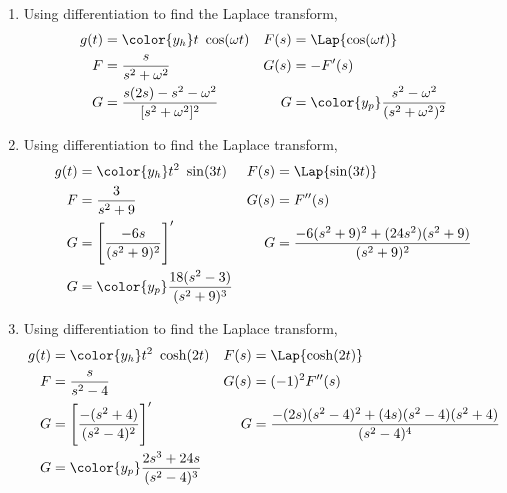 \begin{enumerate}
    \item Using differentiation to find the Laplace transform,
          \begin{align}
              g(t) & = \color{y_h} t\ \cos(\omega t)                         &
              F(s) & = \Lap\{ \cos(\omega t) \}                                \\
              F    & = \frac{s}{s^2 + \omega^2}                              &
              G(s) & = -F'(s)                                                  \\
              G    & = \frac{s(2s) - s^2 - \omega^2}{[s^2 + \omega^2]^2}     &
              G    & = \color{y_p} \frac{s^2 - \omega^2}{(s^2 + \omega^2)^2}
          \end{align}

    \item Using differentiation to find the Laplace transform,
          \begin{align}
              g(t) & = \color{y_h} t^2\ \sin(3t)                            &
              F(s) & = \Lap\{ \sin(3t) \}                                     \\
              F    & = \frac{3}{s^2 + 9}                                    &
              G(s) & = F''(s)                                                 \\
              G    & = \Bigg[ \frac{-6s}{(s^2 + 9)^2} \Bigg]'               &
              G    & = \frac{-6(s^2 + 9)^2 + (24s^2)(s^2 + 9)}{(s^2 + 9)^2}   \\
              G    & = \color{y_p} \frac{18(s^2 - 3)}{(s^2 + 9)^3}
          \end{align}

    \item Using differentiation to find the Laplace transform,
          \begin{align}
              g(t) & = \color{y_h} t^2\ \cosh(2t)                                    &
              F(s) & = \Lap\{ \cosh(2t) \}                                             \\
              F    & = \frac{s}{s^2 - 4}                                             &
              G(s) & = (-1)^2 F''(s)                                                   \\
              G    & = \Bigg[ \frac{-(s^2 + 4)}{(s^2 - 4)^2} \Bigg]'                 &
              G    & = \frac{-(2s)(s^2 - 4)^2 + (4s)(s^2 - 4)(s^2 + 4)}{(s^2 - 4)^4}   \\
              G    & = \color{y_p} \frac{2s^3 + 24s}{(s^2 - 4)^3}
          \end{align}


\end{enumerate}
